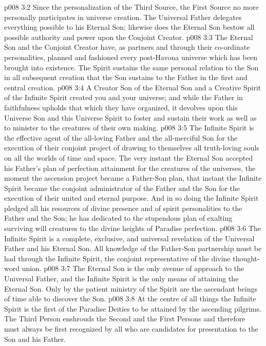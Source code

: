 \vs p008 3:2 Since the personalization of the Third Source, the First Source no more personally participates in universe creation. The Universal Father delegates everything possible to his Eternal Son; likewise does the Eternal Son bestow all possible authority and power upon the Conjoint Creator.
\vs p008 3:3 The Eternal Son and the Conjoint Creator have, as partners and through their co\hyp{}ordinate personalities, planned and fashioned every post\hyp{}Havona universe which has been brought into existence. The Spirit sustains the same personal relation to the Son in all subsequent creation that the Son sustains to the Father in the first and central creation.
\vs p008 3:4 A Creator Son of the Eternal Son and a Creative Spirit of the Infinite Spirit created you and your universe; and while the Father in faithfulness upholds that which they have organized, it devolves upon this Universe Son and this Universe Spirit to foster and sustain their work as well as to minister to the creatures of their own making.
\vs p008 3:5 \pc The Infinite Spirit is the effective agent of the all\hyp{}loving Father and the all\hyp{}merciful Son for the execution of their conjoint project of drawing to themselves all truth\hyp{}loving souls on all the worlds of time and space. The very instant the Eternal Son accepted his Father’s plan of perfection attainment for the creatures of the universes, the moment the ascension project became a Father\hyp{}Son plan, that instant the Infinite Spirit became the conjoint administrator of the Father and the Son for the execution of their united and eternal purpose. And in so doing the Infinite Spirit pledged all his resources of divine presence and of spirit personalities to the Father and the Son; he has dedicated  to the stupendous plan of exalting surviving will creatures to the divine heights of Paradise perfection.
\vs p008 3:6 The Infinite Spirit is a complete, exclusive, and universal revelation of the Universal Father and his Eternal Son. All knowledge of the Father\hyp{}Son partnership must be had through the Infinite Spirit, the conjoint representative of the divine thought\hyp{}word union.
\vs p008 3:7 The Eternal Son is the only avenue of approach to the Universal Father, and the Infinite Spirit is the only means of attaining the Eternal Son. Only by the patient ministry of the Spirit are the ascendant beings of time able to discover the Son.
\vs p008 3:8 At the centre of all things the Infinite Spirit is the first of the Paradise Deities to be attained by the ascending pilgrims. The Third Person enshrouds the Second and the First Persons and therefore must always be first recognized by all who are candidates for presentation to the Son and his Father.

